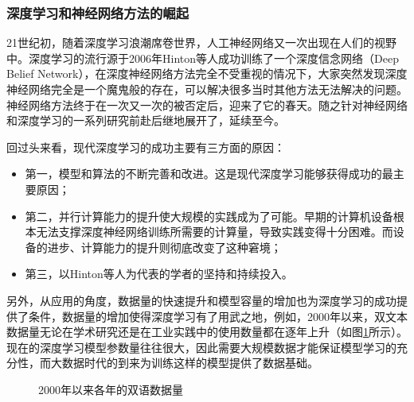 
\subsubsection{深度学习和神经网络方法的崛起}

\parinterval 21世纪初，随着深度学习浪潮席卷世界，人工神经网络又一次出现在人们的视野中。深度学习的流行源于2006年Hinton等人成功训练了一个深度信念网络（Deep Belief Network），在深度神经网络方法完全不受重视的情况下，大家突然发现深度神经网络完全是一个魔鬼般的存在，可以解决很多当时其他方法无法解决的问题。神经网络方法终于在一次又一次的被否定后，迎来了它的春天。随之针对神经网络和深度学习的一系列研究前赴后继地展开了，延续至今。

\parinterval 回过头来看，现代深度学习的成功主要有三方面的原因：

\begin{itemize}
\vspace{0.5em}
\item 第一，模型和算法的不断完善和改进。这是现代深度学习能够获得成功的最主要原因；
\vspace{0.5em}
\item 第二，并行计算能力的提升使大规模的实践成为了可能。早期的计算机设备根本无法支撑深度神经网络训练所需要的计算量，导致实践变得十分困难。而设备的进步、计算能力的提升则彻底改变了这种窘境；
\vspace{0.5em}
\item 第三，以Hinton等人为代表的学者的坚持和持续投入。
\vspace{0.5em}
\end{itemize}

\parinterval 另外，从应用的角度，数据量的快速提升和模型容量的增加也为深度学习的成功提供了条件，数据量的增加使得深度学习有了用武之地，例如，2000年以来，双文本数据量无论在学术研究还是在工业实践中的使用数量都在逐年上升（如图\ref{fig:5-1}所示）。现在的深度学习模型参数量往往很大，因此需要大规模数据才能保证模型学习的充分性，而大数据时代的到来为训练这样的模型提供了数据基础。

\begin{figure}[htp]
\centering
 
\caption{2000年以来各年的双语数据量}
\label{fig:5-1}
\end{figure}

